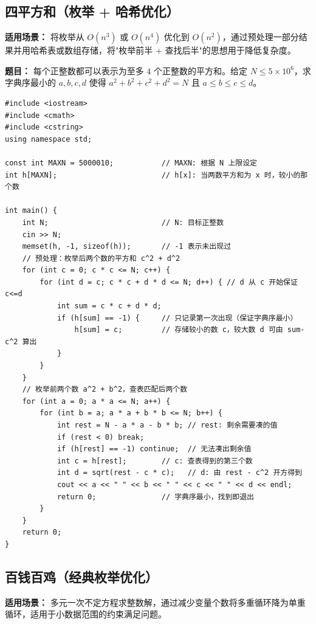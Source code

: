 \documentclass[12pt,a4paper]{ctexart}
\begin{document}
\subsection{四平方和（枚举 + 哈希优化）}
\textbf{适用场景：} 将枚举从 $O(n^3)$ 或 $O(n^4)$ 优化到 $O(n^2)$，通过预处理一部分结果并用哈希表或数组存储，将"枚举前半 + 查找后半"的思想用于降低复杂度。

\textbf{题目：} 每个正整数都可以表示为至多 $4$ 个正整数的平方和。给定 $N \le 5\times 10^6$，求字典序最小的 $a,b,c,d$ 使得 $a^2+b^2+c^2+d^2=N$ 且 $a\le b\le c\le d$。

\begin{lstlisting}[caption={四平方和——枚举前两项 + 哈希查表}]
#include <iostream>
#include <cmath>
#include <cstring>
using namespace std;

const int MAXN = 5000010;           // MAXN: 根据 N 上限设定
int h[MAXN];                        // h[x]: 当两数平方和为 x 时，较小的那个数

int main() {
    int N;                          // N: 目标正整数
    cin >> N;
    memset(h, -1, sizeof(h));       // -1 表示未出现过
    // 预处理：枚举后两个数的平方和 c^2 + d^2
    for (int c = 0; c * c <= N; c++) {
        for (int d = c; c * c + d * d <= N; d++) { // d 从 c 开始保证 c<=d
            int sum = c * c + d * d;
            if (h[sum] == -1) {     // 只记录第一次出现（保证字典序最小）
                h[sum] = c;         // 存储较小的数 c，较大数 d 可由 sum-c^2 算出
            }
        }
    }
    // 枚举前两个数 a^2 + b^2，查表匹配后两个数
    for (int a = 0; a * a <= N; a++) {
        for (int b = a; a * a + b * b <= N; b++) {
            int rest = N - a * a - b * b; // rest: 剩余需要凑的值
            if (rest < 0) break;
            if (h[rest] == -1) continue;  // 无法凑出剩余值
            int c = h[rest];        // c: 查表得到的第三个数
            int d = sqrt(rest - c * c);   // d: 由 rest - c^2 开方得到
            cout << a << " " << b << " " << c << " " << d << endl;
            return 0;               // 字典序最小，找到即退出
        }
    }
    return 0;
}
\end{lstlisting}

\subsection{百钱百鸡（经典枚举优化）}
\textbf{适用场景：} 多元一次不定方程求整数解，通过减少变量个数将多重循环降为单重循环，适用于小数据范围的约束满足问题。
\end{document}
